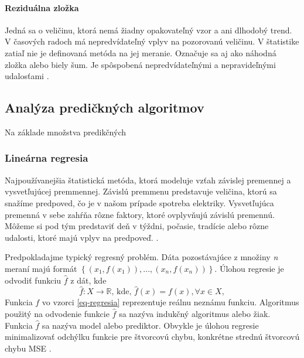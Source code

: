 \documentclass[a4paper,slovak,12pt,appendix]{article}
\begin{document}
\paragraph{Reziduálna zložka}
Jedná sa o veličinu, ktorá nemá žiadny opakovateľný vzor a ani dlhodobý trend.
V časových radoch má nepredvídateľný vplyv na pozorovanú veličinu. V štatistike
zatiaľ nie je definovaná metóda na jej meranie. Označuje sa aj ako náhodná
zložka alebo biely šum. Je spôspobená nepredvídateľnými a nepravideľnými
udalosťami \cite{Agrawal2013}.


\subsection{Analýza predičkných algoritmov}
Na základe množstva predikčných


\subsubsection{Lineárna regresia}
Najpoužívanejšia štatistická metóda, ktorá modeluje vzťah závislej premennej
a vysvetľujúcej premmennej. Závislú premmenu predstavuje veličina, ktorú sa
snažíme predpoved, čo je v našom prípade spotreba elektriky. Vysvetľujúca
premenná v sebe zahŕňa rôzne faktory, ktoré ovplyvňujú závislú premennú.
Môžeme si pod tým predstaviť deň v týždni, počasie, tradície alebo rôzne
udalosti, ktoré majú vplyv na predpoveď. \cite{KumarSingh2013}.

Predpokladajme typický regresný problém. Dáta pozostávajúce z množiny \textit{n}
meraní majú formát $\left\{(x_1, \textit{f}(x_1)), ..., (x_n, \textit{f}(x_n))\right\}$.
Úlohou regresie je odvodiť funkciu $\hat{f}$ z dát, kde
\begin{equation}
  \hat{f} : X \to \mathbb{R} \text{, kde, } \hat{f}(x) = f(x), \forall x \in \textit{X},
  \label{eq-regresia}
\end{equation}
Funkcia $f$ vo vzorci \ref{eq-regresia} reprezentuje reálnu neznámu
funkciu. Algoritmus použitý na odvodenie funkcie $\hat{f}$ sa nazýva
indukčný algoritmus alebo žiak. Funkcia $\hat{f}$ sa nazýva model alebo
prediktor. Obvykle je úlohou regresie minimalizovať odchýlku funkcie pre
štvorcovú chybu, konkrétne strednú štvorcovú chybu MSE \cite{Mendes-Moreira2012}.
\end{document}
